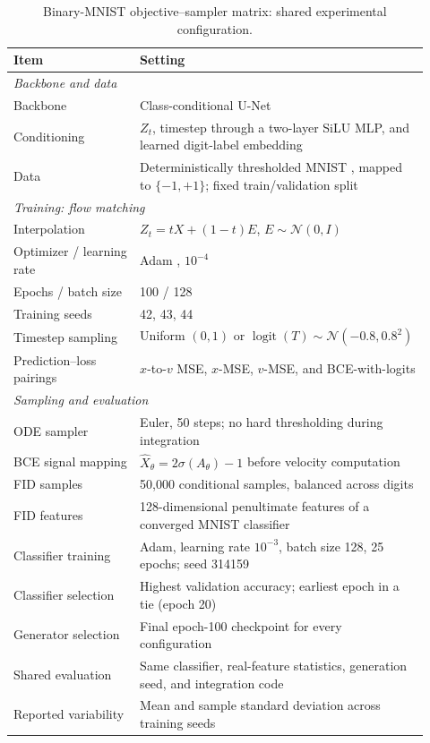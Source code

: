 \documentclass{article}
\theoremstyle{plain}
\theoremstyle{definition}
\theoremstyle{remark}
\begin{document}
\begin{table}[!ht]
\centering
\small
\caption{Binary-MNIST objective--sampler matrix: shared experimental configuration.}
\label{tab:bmnist_settings}
\begin{tabular}{p{0.28\linewidth} p{0.64\linewidth}}
\toprule
\textbf{Item} & \textbf{Setting} \\
\midrule
\multicolumn{2}{l}{\textit{Backbone and data}} \\
Backbone & Class-conditional U-Net \citep{ronneberger2015unet} \\
Conditioning & $Z_t$, timestep through a two-layer SiLU MLP, and learned digit-label embedding \\
Data & Deterministically thresholded MNIST \citep{lecunmnist}, mapped to $\{-1,+1\}$; fixed train/validation split \\
\midrule
\multicolumn{2}{l}{\textit{Training: flow matching}} \\
Interpolation & $Z_t=tX+(1-t)E$, $E\sim\mathcal N(0,I)$ \\
Optimizer / learning rate & Adam \citep{kingma2015adam}, $10^{-4}$ \\
Epochs / batch size & 100 / 128 \\
Training seeds & 42, 43, 44 \\
Timestep sampling & Uniform $(0,1)$ or $\operatorname{logit}(T)\sim\mathcal N(-0.8,0.8^2)$ \\
Prediction--loss pairings & $x$-to-$v$ MSE, $x$-MSE, $v$-MSE, and BCE-with-logits \\
\midrule
\multicolumn{2}{l}{\textit{Sampling and evaluation}} \\
ODE sampler & Euler, 50 steps; no hard thresholding during integration \\
BCE signal mapping & $\hat X_\theta=2\sigma(A_\theta)-1$ before velocity computation \\
FID samples & 50,000 conditional samples, balanced across digits \\
FID features & 128-dimensional penultimate features of a converged MNIST classifier \\
Classifier training & Adam, learning rate $10^{-3}$, batch size 128, 25 epochs; seed 314159 \\
Classifier selection & Highest validation accuracy; earliest epoch in a tie (epoch 20) \\
Generator selection & Final epoch-100 checkpoint for every configuration \\
Shared evaluation & Same classifier, real-feature statistics, generation seed, and integration code \\
Reported variability & Mean and sample standard deviation across training seeds \\
\bottomrule
\end{tabular}
\end{table}
\end{document}
